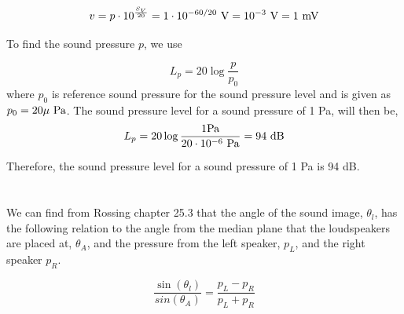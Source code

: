 \documentclass{article}
\begin{document}


\begin{equation*}
    v = p \cdot 10^{\frac{S_V}{20}} = 1 \cdot 10^{-60/20} \ {\rm V} = 10^{-3} \ {\rm V} = 1 \ {\rm mV}
\end{equation*}




To find the sound pressure $p$, we use

\begin{equation*}
    L_p=20 \log{\frac{p}{p_0}}
\end{equation*}
where $p_0$ is reference sound pressure for the sound pressure level and is given as $p_0 = 20 \mu \ {\rm Pa}$. The sound pressure level for a sound pressure of 1 Pa, will then be, 
\begin{equation*}
    L_p=20\log{\frac{1 {\rm Pa}}{20 \cdot 10^{-6}\ {\rm Pa}}} = 94 \ {\rm dB}
\end{equation*}

Therefore, the sound pressure level for a sound pressure of 1 Pa is 94 dB.

\section{}

We can find from Rossing chapter 25.3 that the angle of the sound image, $\theta_l$, has the following relation to the angle from the median plane that the loudspeakers are placed at, $\theta_A$, and the pressure from the left speaker, $p_L$, and the right speaker $p_R$.

\begin{equation}
    \frac{\sin(\theta_l)}{sin(\theta_A)} = \frac{p_L - p_R}{p_L+p_R}
\end{equation}
\end{document}
